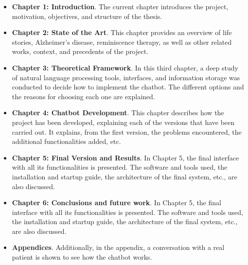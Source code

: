 \begin{itemize}
	\item \textbf{Chapter 1: Introduction}. The current chapter introduces the project, motivation, objectives, and structure of the thesis.
	\item \textbf{Chapter 2: State of the Art}. This chapter provides an overview of life stories, Alzheimer's disease, reminiscence therapy, as well as other related works, context, and precedents of the project.
	\item \textbf{Chapter 3: Theoretical Framework}. In this third chapter, a deep study of natural language processing tools, interfaces, and information storage was conducted to decide how to implement the chatbot. The different options and the reasons for choosing each one are explained.
	\item \textbf{Chapter 4: Chatbot Development}. This chapter describes how the project has been developed, explaining each of the versions that have been carried out. It explains, from the first version, the problems encountered, the additional functionalities added, etc.
	\item \textbf{Chapter 5: Final Version and Results}. In Chapter 5, the final interface with all its functionalities is presented. The software and tools used, the installation and startup guide, the architecture of the final system, etc., are also discussed.
	\item \textbf{Chapter 6: Conclusions and future work}. In Chapter 5, the final interface with all its functionalities is presented. The software and tools used, the installation and startup guide, the architecture of the final system, etc., are also discussed.
	\item \textbf{Appendices}. Additionally, in the appendix, a conversation with a real patient is shown to see how the chatbot works.
\end{itemize}













